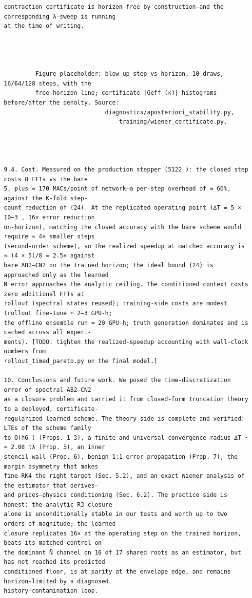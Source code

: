 \documentclass[letterpaper]{article}
\begin{document}
\begin{Verbatim}[fontsize=\fontsize{6.35}{7.15}\selectfont,breaklines=false]
contraction certificate is horizon-free by construction—and the corresponding λ-sweep is running
at the time of writing.




         Figure placeholder: blow-up step vs horizon, 10 draws, 16/64/128 steps, with the
         free-horizon line; certificate |Geff (κ)| histograms before/after the penalty. Source:
                             diagnostics/aposteriori_stability.py,
                                 training/wiener_certificate.py.




9.4. Cost. Measured on the production stepper (5122 ): the closed step costs 8 FFTs vs the bare
5, plus ≈ 170 MACs/point of network—a per-step overhead of ≈ 60%, against the K-fold step-
count reduction of (24). At the replicated operating point (∆T = 5 × 10−3 , 16× error reduction
on-horizon), matching the closed accuracy with the bare scheme would require ≈ 4× smaller steps
(second-order scheme), so the realized speedup at matched accuracy is ≈ (4 × 5)/8 = 2.5× against
bare AB2–CN2 on the trained horizon; the ideal bound (24) is approached only as the learned
N̈ error approaches the analytic ceiling. The conditioned context costs zero additional FFTs at
rollout (spectral states reused); training-side costs are modest (rollout fine-tune ≈ 2–3 GPU-h;
the offline ensemble run ≈ 20 GPU-h; truth generation dominates and is cached across all experi-
ments). [TODO: tighten the realized-speedup accounting with wall-clock numbers from
rollout_timed_pareto.py on the final model.]

10. Conclusions and future work. We posed the time-discretization error of spectral AB2–CN2
as a closure problem and carried it from closed-form truncation theory to a deployed, certificate-
regularized learned scheme. The theory side is complete and verified: LTEs of the scheme family
to O(h6 ) (Props. 1–3), a finite and universal convergence radius ∆T ⋆ = 2.08 τλ (Prop. 5), an inner
stencil wall (Prop. 6), benign 1:1 error propagation (Prop. 7), the margin asymmetry that makes
fine-RK4 the right target (Sec. 5.2), and an exact Wiener analysis of the estimator that derives—
and prices—physics conditioning (Sec. 6.2). The practice side is honest: the analytic R3 closure
alone is unconditionally stable in our tests and worth up to two orders of magnitude; the learned
closure replicates 16× at the operating step on the trained horizon, beats its matched control on
the dominant N̈ channel on 16 of 17 shared roots as an estimator, but has not reached its predicted
conditioned floor, is at parity at the envelope edge, and remains horizon-limited by a diagnosed
history-contamination loop.


\end{Verbatim}
\end{document}
